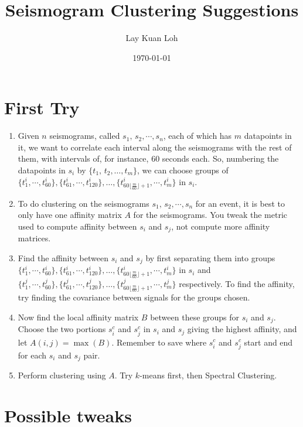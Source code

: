 \documentclass[a4paper, 11pt]{article} %
\title{Seismogram Clustering Suggestions} %
\author{Lay Kuan Loh} %
\date{\today} %
\begin{document}
\maketitle %

\section{First Try}

\begin{enumerate}
 	\item Given $n$ seismograms, called $s_1,\,s_2,\cdots,s_n$, each of which has $m$ datapoints in it, we want to correlate each interval along the seismograms with the rest of them, with intervals of, for instance, 60 seconds each. So, numbering the datapoints in $s_i$ by $\{t_1,\,t_2,\ldots,t_m\}$, we can choose groups of $\{t^i_1,\cdots,t^i_{60}\},\{t^i_{61},\cdots,t^i_{120}\},\ldots,\{t^i_{60\lfloor\frac{m}{60}\rfloor+ 1},\cdots,t^i_m\}$ in $s_i$. 

	\item To do clustering on the seismograms $s_1,\,s_2,\cdots,s_n$ for an event, it is best to only have one affinity matrix $A$ for the seismograms. You tweak the metric used to compute affinity between $s_i$ and $s_j$, not compute more affinity matrices. 

	\item Find the affinity between $s_i$ and $s_j$ by first separating them into groups $\{t^i_1,\cdots,t^i_{60}\},\{t^i_{61},\cdots,t^i_{120}\},\ldots,\{t^i_{60\lfloor\frac{m}{60}\rfloor+ 1},\cdots,t^i_m\}$ in $s_i$ and $\{t^j_1,\cdots,t^j_{60}\},\{t^j_{61},\cdots,t^j_{120}\},\ldots,\{t^j_{60\lfloor\frac{m}{60}\rfloor+ 1},\cdots,t^j_m\}$ respectively. To find the affinity, try finding the covariance between signals for the groups chosen. 

	\item Now find the local affinity matrix $B$ between these groups for $s_i$ and $s_j$. Choose the two portions $s_i^c$ and $s_j^c$ in $s_i$ and $s_j$ giving the highest affinity, and let $A(i,j) = \max(B)$. Remember to save where $s_i^c$ and $s_j^c$ start and end for each $s_i$ and $s_j$ pair. 

	\item Perform clustering using $A$. Try $k$-means first, then Spectral Clustering.
\end{enumerate}

\section{Possible tweaks}
\end{document}
